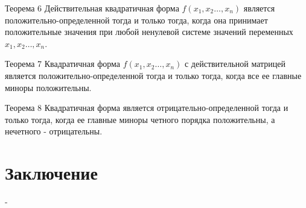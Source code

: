 \documentclass[10pt,pdf,hyperref={unicode}]{beamer}
\begin{document}
\begin{frame}

\begin{block}{Теорема 6} 
Действительная квадратичная форма $f(x_1,x_2…,x_n)$ является положительно-определенной тогда и только тогда, когда она принимает положительные значения при любой ненулевой системе значений переменных $x_1,x_2…,x_n$. 
\end{block}

\begin{block}{Теорема 7} 
Квадратичная форма $f(x_1,x_2…,x_n)$ с действительной матрицей является положительно-определенной тогда и только тогда, когда все ее главные миноры положительны.
\end{block}

\begin{block}{Теорема 8} 
Квадратичная форма является отрицательно-определенной тогда и только тогда, когда ее главные миноры четного порядка положительны, а нечетного - отрицательны.
\end{block}

\end{frame} 

\section{Заключение}
\begin{frame}
-
\end{frame} 
\end{document}
